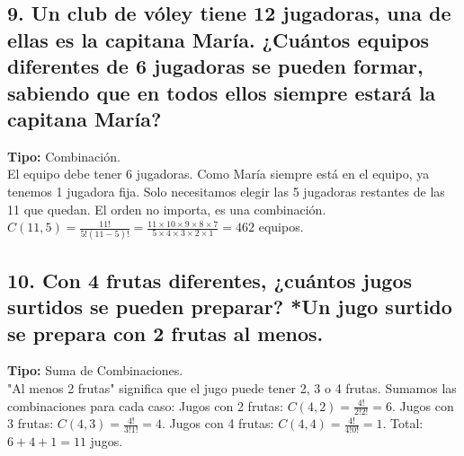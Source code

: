 \documentclass[11pt]{article}
\begin{document}
    \subsection*{9. Un club de vóley tiene 12 jugadoras, una de ellas es la capitana María. ¿Cuántos equipos diferentes de 6 jugadoras se pueden formar, sabiendo que en todos ellos siempre estará la capitana María?}
    \textbf{Tipo:} Combinación. \\
    El equipo debe tener 6 jugadoras. Como María siempre está en el equipo, ya tenemos 1 jugadora fija. Solo necesitamos elegir las 5 jugadoras restantes de las 11 que quedan. El orden no importa, es una combinación.
    $C(11,5) = \frac{11!}{5!(11-5)!} = \frac{11 \times 10 \times 9 \times 8 \times 7}{5 \times 4 \times 3 \times 2 \times 1} = 462$ equipos.

    \subsection*{10. Con 4 frutas diferentes, ¿cuántos jugos surtidos se pueden preparar? *Un jugo surtido se prepara con 2 frutas al menos.}
    \textbf{Tipo:} Suma de Combinaciones. \\
    "Al menos 2 frutas" significa que el jugo puede tener 2, 3 o 4 frutas. Sumamos las combinaciones para cada caso:
    Jugos con 2 frutas: $C(4,2) = \frac{4!}{2!2!} = 6$.
    Jugos con 3 frutas: $C(4,3) = \frac{4!}{3!1!} = 4$.
    Jugos con 4 frutas: $C(4,4) = \frac{4!}{4!0!} = 1$.
    Total: $6 + 4 + 1 = 11$ jugos.
    
\end{document}
